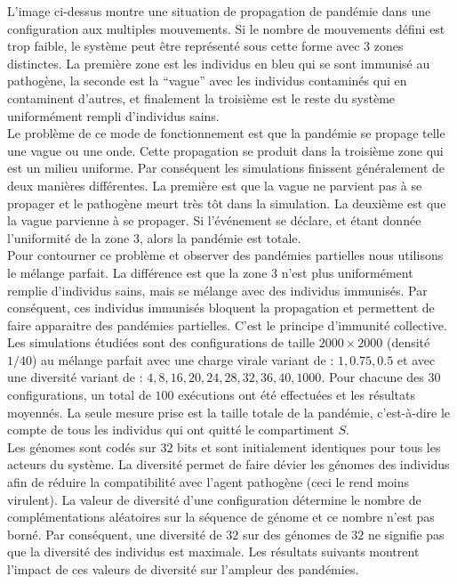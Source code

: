 L’image ci-dessus montre une situation de propagation de pandémie dans une configuration aux multiples mouvements. Si le nombre de mouvements défini est trop faible, le système peut être représenté sous cette forme avec $3$ zones distinctes. La première zone est les individus en bleu qui se sont immunisé au pathogène, la seconde est la “vague” avec les individus contaminés qui en contaminent d’autres, et finalement la troisième est le reste du système uniformément rempli d’individus sains.\\ 

Le problème de ce mode de fonctionnement est que la pandémie se propage telle une vague ou une onde. Cette propagation se produit dans la troisième zone qui est un milieu uniforme. Par conséquent les simulations finissent généralement de deux manières différentes. La première est que la vague ne parvient pas à se propager et le pathogène meurt très tôt dans la simulation. La deuxième est que la vague parvienne à se propager. Si l'événement se déclare, et étant donnée l'uniformité de la zone $3$, alors la pandémie est totale.\\ 

Pour contourner ce problème et observer des pandémies partielles nous utilisons le mélange parfait. La différence est que la zone $3$ n’est plus uniformément remplie d’individus sains, mais se mélange avec des individus immunisés. Par conséquent, ces individus immunisés bloquent la propagation et permettent de faire apparaitre des pandémies partielles. C’est le principe d’immunité collective.\\ 

Les simulations étudiées sont des configurations de taille $2000 \times 2000$ (densité $1/40$) au mélange parfait avec une charge virale variant de : $1, 0.75, 0.5$ et avec une diversité variant de : $4,8,16,20,24,28,32,36,40,1000$. Pour chacune des $30$ configurations, un total de $100$ exécutions ont été effectuées et les résultats moyennés. La seule mesure prise est la taille totale de la pandémie, c'est-à-dire le compte de tous les individus qui ont quitté le compartiment $S$.\\

Les génomes sont codés sur $32$ bits et sont initialement identiques pour tous les acteurs du système. La diversité permet de faire dévier les génomes des individus afin de réduire la compatibilité avec l'agent pathogène (ceci le rend moins virulent). La valeur de diversité d'une configuration détermine le nombre de complémentations aléatoires sur la séquence de génome et ce nombre n'est pas borné. Par conséquent, une diversité de $32$ sur des génomes de $32$ ne signifie pas que la diversité des individus est maximale. Les résultats suivants montrent l'impact de ces valeurs de diversité sur l'ampleur des pandémies.

